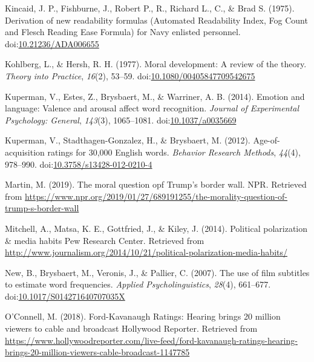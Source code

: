 \documentclass[english,,man]{apa6}
\begin{document}
\leavevmode\hypertarget{ref-Kincaid1975}{}%
Kincaid, J. P., Fishburne, J., Robert P., R., Richard L., C., \& Brad S. (1975). Derivation of new readability formulas (Automated Readability Index, Fog Count and Flesch Reading Ease Formula) for Navy enlisted personnel. doi:\href{https://doi.org/10.21236/ADA006655}{10.21236/ADA006655}

\leavevmode\hypertarget{ref-Kohlberg1977}{}%
Kohlberg, L., \& Hersh, R. H. (1977). Moral development: A review of the theory. \emph{Theory into Practice}, \emph{16}(2), 53--59. doi:\href{https://doi.org/10.1080/00405847709542675}{10.1080/00405847709542675}

\leavevmode\hypertarget{ref-Kuperman2014}{}%
Kuperman, V., Estes, Z., Brysbaert, M., \& Warriner, A. B. (2014). Emotion and language: Valence and arousal affect word recognition. \emph{Journal of Experimental Psychology: General}, \emph{143}(3), 1065--1081. doi:\href{https://doi.org/10.1037/a0035669}{10.1037/a0035669}

\leavevmode\hypertarget{ref-Kuperman2012}{}%
Kuperman, V., Stadthagen-Gonzalez, H., \& Brysbaert, M. (2012). Age-of-acquisition ratings for 30,000 English words. \emph{Behavior Research Methods}, \emph{44}(4), 978--990. doi:\href{https://doi.org/10.3758/s13428-012-0210-4}{10.3758/s13428-012-0210-4}

\leavevmode\hypertarget{ref-Martin2019}{}%
Martin, M. (2019). The moral question opf Trump's border wall. NPR. Retrieved from \url{https://www.npr.org/2019/01/27/689191255/the-morality-question-of-trump-s-border-wall}

\leavevmode\hypertarget{ref-Mitchell2014}{}%
Mitchell, A., Matsa, K. E., Gottfried, J., \& Kiley, J. (2014). Political polarization \& media habits \textbar{} Pew Research Center. Retrieved from \url{http://www.journalism.org/2014/10/21/political-polarization-media-habits/}

\leavevmode\hypertarget{ref-New2007}{}%
New, B., Brysbaert, M., Veronis, J., \& Pallier, C. (2007). The use of film subtitles to estimate word frequencies. \emph{Applied Psycholinguistics}, \emph{28}(4), 661--677. doi:\href{https://doi.org/10.1017/S014271640707035X}{10.1017/S014271640707035X}

\leavevmode\hypertarget{ref-OConnell2018}{}%
O'Connell, M. (2018). Ford-Kavanaugh Ratings: Hearing brings 20 million viewers to cable and broadcast \textbar{} Hollywood Reporter. Retrieved from \url{https://www.hollywoodreporter.com/live-feed/ford-kavanaugh-ratings-hearing-brings-20-million-viewers-cable-broadcast-1147785}
\end{document}
